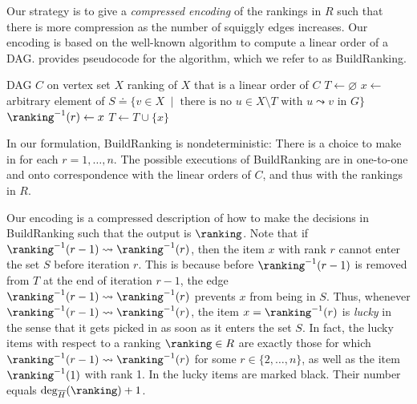 Our strategy is to give a \emph{compressed encoding} of the rankings in $R$ such that there is more compression as the number of squiggly edges increases. Our encoding is based on the well-known algorithm to compute a linear order of a DAG.  provides pseudocode for
the algorithm, which we refer to as BuildRanking.

\begin{algorithm}[ht]
  \caption{BuildRanking$(C)$}\label{alg:linear-order}
  \begin{algorithmic}[1]
    \Require DAG $C$ on vertex set $X$
    \Ensure ranking of $X$ that is a linear order of $C$
    \State $T \gets \varnothing$
      \State \label{alg:linear-order:step}%
      $x \gets$ arbitrary element of $S \doteq  \{ v \in X \;\mid\; \text{there is no } u \in X \setminus T \text{ with } u \leadsto v \text{ in } G \}$
      \State $\ranking^{-1}(r) \gets x$ 
      \State $T \gets T \cup \{x\}$
    \EndFor
  \end{algorithmic}
\end{algorithm}

In our formulation, BuildRanking is nondeterministic: There is a choice to make in  for each $r=1,\dots,n$. The possible executions of BuildRanking are in one-to-one and onto correspondence with the linear orders of $C$, and thus with the rankings in $R$. 

Our encoding is a compressed description of how to make the decisions in BuildRanking such that the output is $\ranking$. Note that if $\ranking^{-1}(r-1) \leadsto \ranking^{-1}(r)$, then the item $x$ with rank $r$ cannot enter the set $S$ before iteration $r$. This is because before $\ranking^{-1}(r-1)$ is removed from $T$ at the end of iteration $r-1$, the edge $\ranking^{-1}(r-1) \leadsto \ranking^{-1}(r)$ prevents $x$ from being in $S$. Thus, whenever $\ranking^{-1}(r-1) \leadsto \ranking^{-1}(r)$, the item $x=\ranking^{-1}(r)$ is \emph{lucky} in the sense that it gets picked in  as soon as it enters the set $S$. In fact, the lucky items with respect to a ranking $\ranking \in R$ are exactly those for which $\ranking^{-1}(r-1) \leadsto \ranking^{-1}(r)$ for some $r \in \{2,\dots,n\}$, as well as the item $\ranking^{-1}(1)$ with rank 1. In  the lucky items are marked black. Their number equals $\deg_{\overline{H}}(\ranking)+1$. 

